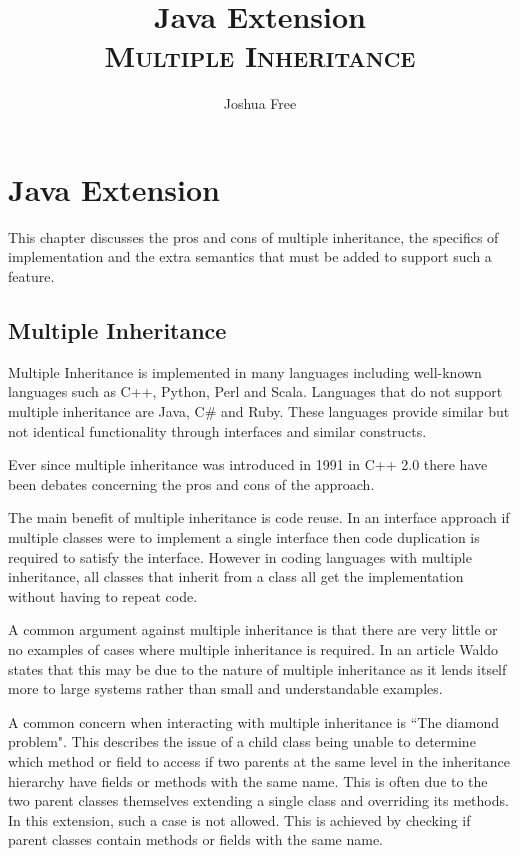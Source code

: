 \documentclass[twocolumn]{article} 	%
\title{Java Extension  \\ \textsc{\small Multiple Inheritance}}
\author{Joshua Free}
\date{}							%
\begin{document}
\maketitle


\section{Java Extension}
This chapter discusses the pros and cons of multiple inheritance, the specifics of implementation and the extra semantics that must be added to support such a feature.
\subsection{Multiple Inheritance}

Multiple Inheritance is implemented in many languages including well-known languages such as C++, Python, Perl and Scala. Languages that do not support multiple inheritance are Java, C\# and Ruby. These languages provide similar but not identical functionality through interfaces and similar constructs.


Ever since multiple inheritance was introduced in 1991 in C++ 2.0  \cite{date} there have been debates concerning the pros and cons of the approach. 

The main benefit of multiple inheritance is code reuse. In an interface approach if multiple classes were to implement a single interface then code duplication is required to satisfy the interface. However in coding languages with multiple inheritance, all classes that inherit from a class all get the implementation without having to repeat code.

A common argument against multiple inheritance is that there are very little or no examples of cases where multiple inheritance is required. In an article Waldo states that this may be due to the nature of multiple inheritance as it lends itself more to large systems rather than small and understandable examples. \cite{examples}  %


A common concern when interacting with multiple inheritance is ``The diamond problem". This describes the issue of a child class being unable to determine which method or field to access if two parents at the same level in the inheritance hierarchy have fields or methods with the same name. This is often due to the two parent classes themselves extending a single class and overriding its methods. In this extension, such a case is not allowed. This is achieved by checking if parent classes contain methods or fields with the same name.
\end{document}
